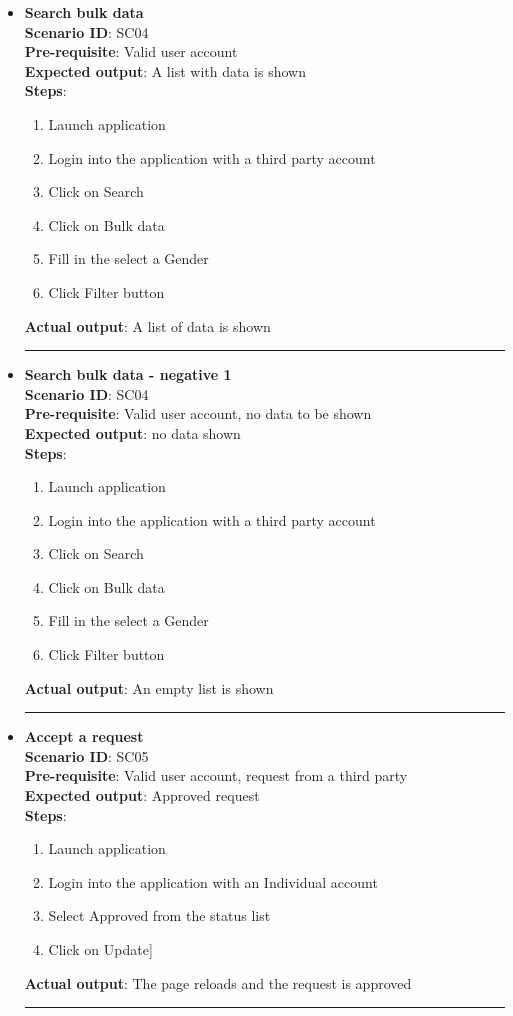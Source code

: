 \documentclass[a4paper, hidelinks, 12pt]{report}
\begin{document}
\begin{itemize}
		\item{\textbf{Search bulk data}} \\
		\textbf{Scenario ID}: SC04 \\
		\textbf{Pre-requisite}: Valid user account \\
		\textbf{Expected output}: A list with data is shown\\
		\textbf{Steps}:
		\begin{enumerate}
			\item{Launch application}
			\item{Login into the application with a third party account}
			\item{Click on Search}
			\item{Click on Bulk data}
			\item{Fill in the select a Gender}
			\item{Click Filter button}
		\end{enumerate}
		\textbf{Actual output}: A list of data is shown\\
		\rule{\linewidth}{0.4pt}

		\item{\textbf{Search bulk data - negative 1}} \\
		\textbf{Scenario ID}: SC04 \\
		\textbf{Pre-requisite}: Valid user account, no data to be shown \\
		\textbf{Expected output}: no data shown\\
		\textbf{Steps}:
		\begin{enumerate}
			\item{Launch application}
			\item{Login into the application with a third party account}
			\item{Click on Search}
			\item{Click on Bulk data}
			\item{Fill in the select a Gender}
			\item{Click Filter button}
		\end{enumerate}
		\textbf{Actual output}: An empty list is shown\\
		\rule{\linewidth}{0.4pt}

		\item{\textbf{Accept a request}} \\
		\textbf{Scenario ID}: SC05 \\
		\textbf{Pre-requisite}: Valid user account,  request from a third party \\
		\textbf{Expected output}: Approved request\\
		\textbf{Steps}:
		\begin{enumerate}
			\item{Launch application}
			\item{Login into the application with an Individual account}
			\item{Select Approved from the status list}
			\item{Click on Update}]
		\end{enumerate}
		\textbf{Actual output}: The page reloads and the request is approved\\
		\rule{\linewidth}{0.4pt}


\end{itemize}
\end{document}
